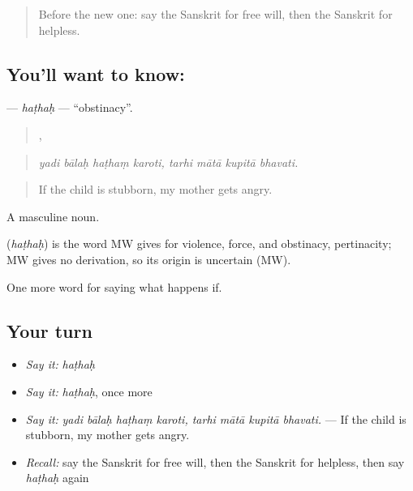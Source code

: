 \label{lesson:SA-C543-hathah}



\begin{quote}
Before the new one: say the Sanskrit for free will, then the Sanskrit for helpless.
\end{quote}

\subsection*{You'll want to know: }
\textbf{} — \emph{haṭhaḥ} — \textquotedblleft{}obstinacy\textquotedblright{}.

\begin{quote}
   ,    
\end{quote}

\begin{quote}
\emph{yadi bālaḥ haṭhaṃ karoti, tarhi mātā kupitā bhavati.}
\end{quote}

\begin{quote}
If the child is stubborn, my mother gets angry.
\end{quote}

A masculine noun.

\begin{cousinweb}
\textbf{} (\emph{haṭhaḥ}) is the word MW gives for violence, force, and obstinacy, pertinacity; MW gives no derivation, so its origin is uncertain (MW).
\end{cousinweb}

\begin{grammarlens}[title={What you've built}]
One more word for saying what happens if.
\end{grammarlens}

\subsection*{Your turn}
\begin{itemize}
\raggedright
  \item \emph{Say it:} \emph{haṭhaḥ}
  \item \emph{Say it:} \emph{haṭhaḥ}, once more
  \item \emph{Say it:} \emph{yadi bālaḥ haṭhaṃ karoti, tarhi mātā kupitā bhavati.} — If the child is stubborn, my mother gets angry.
  \item \emph{Recall:} say the Sanskrit for free will, then the Sanskrit for helpless, then say \emph{haṭhaḥ} again
\end{itemize}

